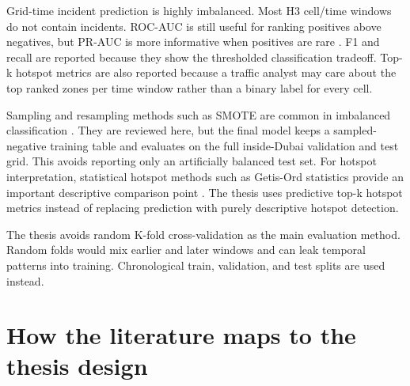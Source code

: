 Grid-time incident prediction is highly imbalanced. Most H3 cell/time windows do not contain incidents. ROC-AUC is still useful for ranking positives above negatives, but PR-AUC is more informative when positives are rare \cite{saito2015prauc}. F1 and recall are reported because they show the thresholded classification tradeoff. Top-k hotspot metrics are also reported because a traffic analyst may care about the top ranked zones per time window rather than a binary label for every cell.

Sampling and resampling methods such as SMOTE are common in imbalanced classification \cite{chawla2002smote}. They are reviewed here, but the final model keeps a sampled-negative training table and evaluates on the full inside-Dubai validation and test grid. This avoids reporting only an artificially balanced test set. For hotspot interpretation, statistical hotspot methods such as Getis-Ord statistics provide an important descriptive comparison point \cite{getis1992distance,ord1995local}. The thesis uses predictive top-k hotspot metrics instead of replacing prediction with purely descriptive hotspot detection.

The thesis avoids random K-fold cross-validation as the main evaluation method. Random folds would mix earlier and later windows and can leak temporal patterns into training. Chronological train, validation, and test splits are used instead.

\section{How the literature maps to the thesis design}

